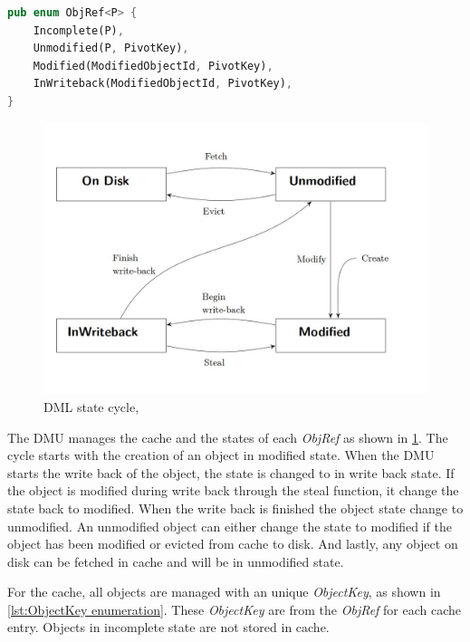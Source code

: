 \documentclass[
	12pt,
	a4paper,
	abstract,
	bibliography=totoc,
	chapterprefix,
	headings=openright,
	numbers=endperiod,
	parskip=half,
	twoside,
]{scrreprt}
\begin{document}
\begin{lstlisting}[language=Rust,mathescape=true,caption={ObjRef enumeration, parameter P equals \&ObjectPointer<D>},
	label=lst:ObjRef enumeration]
pub enum ObjRef<P> {
    Incomplete(P),
    Unmodified(P, PivotKey),
    Modified(ModifiedObjectId, PivotKey),
    InWriteback(ModifiedObjectId, PivotKey),
}
\end{lstlisting}

\begin{figure}[ht]
	\centering
	\includegraphics[scale=0.4]{DML_state_cycle.jpg}
	\caption{DML state cycle, \cite{wiedemann2018modern}}
		\label{fig:DML state cycle}
\end{figure}

The DMU manages the cache and the states of each \emph{ObjRef} as shown in \ref{fig:DML state cycle}.
The cycle starts with the creation of an object in modified state. When the DMU starts the write back of the object, the state
is changed to in write back state.
If the object is modified during write back through the steal function, it change the state back to modified.
When the write back is finished the object state change to unmodified.
An unmodified object can either change the state to modified if the object has been modified or evicted from cache to disk.
And lastly, any object on disk can be fetched in cache and will be in unmodified state.

For the cache, all objects are managed with an unique \emph{ObjectKey}, as shown in \ref{lst:ObjectKey enumeration}.
These \emph{ObjectKey} are  from the \emph{ObjRef} for each cache entry.
Objects in incomplete state are not stored in cache.
\end{document}
